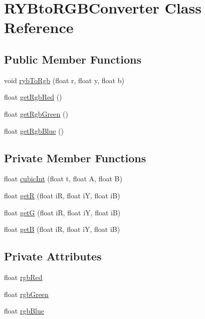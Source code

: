 \hypertarget{class_r_y_bto_r_g_b_converter}{\section{R\+Y\+Bto\+R\+G\+B\+Converter Class Reference}
\label{class_r_y_bto_r_g_b_converter}
}
\subsection*{Public Member Functions}
\begin{DoxyCompactItemize}
\item 
void \hyperlink{class_r_y_bto_r_g_b_converter_a6dab40192f708189692cbd40bb6746ce}{ryb\+To\+Rgb} (float r, float y, float b)
\item 
float \hyperlink{class_r_y_bto_r_g_b_converter_a0fa74e359824fe523d34316cc4987dc9}{get\+Rgb\+Red} ()
\item 
float \hyperlink{class_r_y_bto_r_g_b_converter_a350c297acd919fab24cf56b8b6e440ae}{get\+Rgb\+Green} ()
\item 
float \hyperlink{class_r_y_bto_r_g_b_converter_a61a5975f4b75050ead145d2dd2a9e34c}{get\+Rgb\+Blue} ()
\end{DoxyCompactItemize}
\subsection*{Private Member Functions}
\begin{DoxyCompactItemize}
\item 
float \hyperlink{class_r_y_bto_r_g_b_converter_a10d6fa707cfea1759ea598428a31e1f3}{cubic\+Int} (float t, float A, float B)
\item 
float \hyperlink{class_r_y_bto_r_g_b_converter_af2f1d99a4bbc363a12b63213f85f037b}{get\+R} (float i\+R, float i\+Y, float i\+B)
\item 
float \hyperlink{class_r_y_bto_r_g_b_converter_a24efbe9a3e8e0cd120f810171b9acc8d}{get\+G} (float i\+R, float i\+Y, float i\+B)
\item 
float \hyperlink{class_r_y_bto_r_g_b_converter_af8ebaf286350163162f8e4435083509c}{get\+B} (float i\+R, float i\+Y, float i\+B)
\end{DoxyCompactItemize}
\subsection*{Private Attributes}
\begin{DoxyCompactItemize}
\item 
float \hyperlink{class_r_y_bto_r_g_b_converter_a467a6e2cdd7258951f11607cf87bbac5}{rgb\+Red}
\item 
float \hyperlink{class_r_y_bto_r_g_b_converter_a8e2915c6efc8c26528bb34a0e5408d47}{rgb\+Green}
\item 
float \hyperlink{class_r_y_bto_r_g_b_converter_ae0aa0add34fe2e687cceceb9b410143f}{rgb\+Blue}
\end{DoxyCompactItemize}


